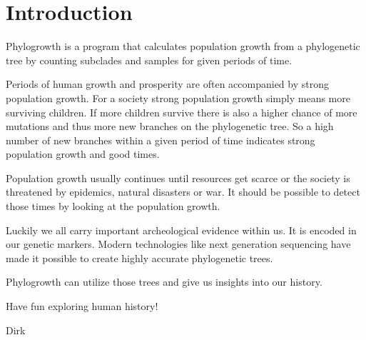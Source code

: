 \section{Introduction}

Phylogrowth is a program that calculates population growth
from a phylogenetic tree by counting subclades and samples
for given periods of time.

Periods of human growth and prosperity are often accompanied
by strong population growth. For a society strong population
growth simply means more surviving children. If more children
survive there is also a higher chance of more mutations and
thus more new branches on the phylogenetic tree. So a high
number of new branches within a given period of time indicates
strong population growth and good times.

Population growth usually continues until resources get scarce
or the society is threatened by epidemics, natural disasters or
war. It should be possible to detect those times by looking at
the population growth.

Luckily we all carry important archeological evidence within us.
It is encoded in our genetic markers. Modern technologies like
next generation sequencing have made it possible to create highly
accurate phylogenetic trees.

Phylogrowth can utilize those trees and give us insights into
our history.


\vspace{1em}\noindent
Have fun exploring human history!

\vspace{1em} Dirk



